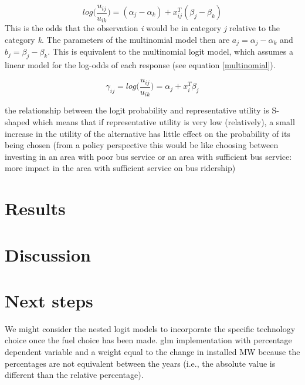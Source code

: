 \documentclass[10pt]{amsart}
\begin{document}
\begin{equation}\label{log_odds}
log\Big(\frac{u_{ij}}{u_{ik}}\Big) = (\alpha_j-\alpha_k) + x_{ij}^T(\beta_j - \beta_k)
\end{equation}
This is the odds that the observation \textit{i} would be in category \textit{j} relative to the category \textit{k}.
The parameters of the multinomial model then are $a_j = \alpha_j - \alpha_k$ and $b_j = \beta_j -\beta_k$. 
This is equivalent to the multinomial logit model, which assumes a linear model for the log-odds of each response (see equation \ref{multinomial}). 

\begin{equation}\label{multinomial}
\gamma_{ij} = log\Big(\frac{u_{ij}}{u_{ik}}\Big) = \alpha_j + x_i^T\beta_j
\end{equation}

the relationship between the logit probability and representative utility is S-shaped which means that if representative utility is very low (relatively), a small increase in the utility of the alternative has little effect on the probability of its being chosen (from a policy perspective this would be like choosing between investing in an area with poor bus service or an area with sufficient bus service: more impact in the area with sufficient service on bus ridership)

\section{Results}

\section{Discussion}


\section{Next steps}
We might consider the nested logit models to incorporate the specific technology choice once the fuel choice has been made. 
glm implementation with percentage dependent variable and a weight equal to the change in installed MW because the percentages are not equivalent between the years (i.e., the absolute value is different than the relative percentage). 

\newpage
{}
\begin{landscape}
\end{landscape}
\restoregeometry

\newpage


\printbibliography
\end{document}
